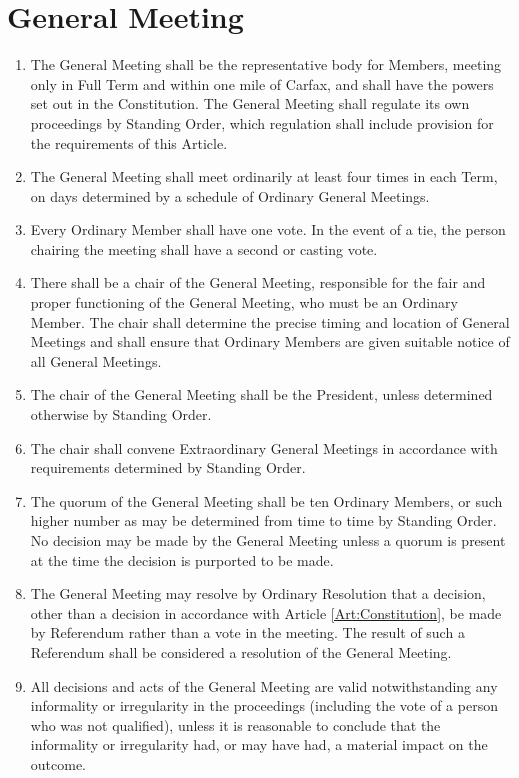 \documentclass[11pt,a4paper, oneside]{memoir}
\begin{document}
	\section{General Meeting} \label{Art:GeneralMeeting}
	\begin{enumerate}
		\item The General Meeting shall be the representative body for Members, meeting only in Full Term and within one mile of Carfax, and shall have the powers set out in the Constitution.
		The General Meeting shall regulate its own proceedings by Standing Order, which regulation shall include provision for the requirements of this Article.
		\item \label{Cl:OGM} The General Meeting shall meet ordinarily at least four times in each Term, on days determined by a schedule of Ordinary General Meetings.
		\item Every Ordinary Member shall have one vote.
		In the event of a tie, the person chairing the meeting shall have a second or casting vote.
		\item There shall be a chair of the General Meeting, responsible for the fair and proper functioning of the General Meeting, who must be an Ordinary Member.
		The chair shall determine the precise timing and location of General Meetings and shall ensure that Ordinary Members are given suitable notice of all General Meetings.
		\item The chair of the General Meeting shall be the President, unless determined otherwise by Standing Order.
		\item The chair shall convene Extraordinary General Meetings in accordance with requirements determined by Standing Order.
		\item The quorum of the General Meeting shall be ten Ordinary Members, or such higher number as may be determined from time to time by Standing Order.
		No decision may be made by the General Meeting unless a quorum is present at the time the decision is purported to be made.
		\item The General Meeting may resolve by Ordinary Resolution that a decision, other than a decision in accordance with Article \ref{Art:Constitution}, be made by Referendum rather than a vote in the meeting.
		The result of such a Referendum shall be considered a resolution of the General Meeting.
		\item All decisions and acts of the General Meeting are valid notwithstanding any informality or irregularity in the proceedings (including the vote of a person who was not qualified), unless it is reasonable to conclude that the informality or irregularity had, or may have had, a material impact on the outcome.
	\end{enumerate}
\end{document}
